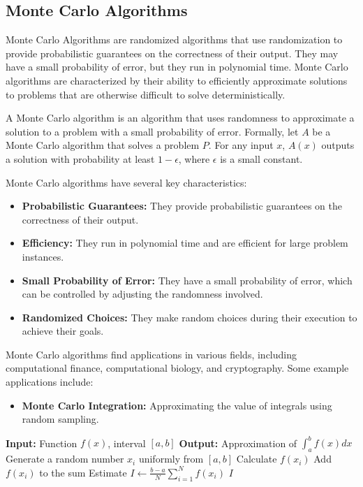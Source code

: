 \documentclass[12pt]{book} %
\begin{document}
\subsection{Monte Carlo Algorithms}
Monte Carlo Algorithms are randomized algorithms that use randomization to provide probabilistic guarantees on the correctness of their output. They may have a small probability of error, but they run in polynomial time. Monte Carlo algorithms are characterized by their ability to efficiently approximate solutions to problems that are otherwise difficult to solve deterministically.

A Monte Carlo algorithm is an algorithm that uses randomness to approximate a solution to a problem with a small probability of error. Formally, let $A$ be a Monte Carlo algorithm that solves a problem $P$. For any input $x$, $A(x)$ outputs a solution with probability at least $1 - \epsilon$, where $\epsilon$ is a small constant.

Monte Carlo algorithms have several key characteristics:
\begin{itemize}
    \item \textbf{Probabilistic Guarantees:} They provide probabilistic guarantees on the correctness of their output.
    \item \textbf{Efficiency:} They run in polynomial time and are efficient for large problem instances.
    \item \textbf{Small Probability of Error:} They have a small probability of error, which can be controlled by adjusting the randomness involved.
    \item \textbf{Randomized Choices:} They make random choices during their execution to achieve their goals.
\end{itemize}

Monte Carlo algorithms find applications in various fields, including computational finance, computational biology, and cryptography. Some example applications include:
\begin{itemize}
    \item \textbf{Monte Carlo Integration:} Approximating the value of integrals using random sampling.
\end{itemize}
\FloatBarrier
\begin{algorithm}
\caption{Monte Carlo Integration}
\begin{algorithmic}[1]
\State \textbf{Input:} Function $f(x)$, interval $[a, b]$
\State \textbf{Output:} Approximation of $\int_a^b f(x) dx$
    \State Generate a random number $x_i$ uniformly from $[a, b]$
    \State Calculate $f(x_i)$
    \State Add $f(x_i)$ to the sum
\EndFor
\State Estimate $I \leftarrow \frac{b - a}{N} \sum_{i=1}^{N} f(x_i)$
\Return $I$
\end{algorithmic}
\end{algorithm}
\FloatBarrier
\end{document}
